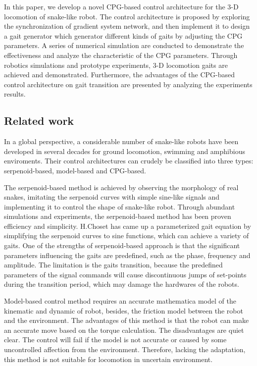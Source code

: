 \documentclass[letterpaper, 10 pt, conference]{ieeeconf}
\begin{document}
In this paper, we develop a novel CPG-based control architecture for the 3-D locomotion of snake-like robot. The control architecture is proposed by exploring the synchronization of gradient system network, and then implement it to design a gait generator which generator different kinds of gaits by adjusting the CPG parameters. A series of numerical simulation are conducted to demonstrate the effectiveness and analyze the characteristic of the CPG parameters. Through robotics simulations and prototype experiments, 3-D locomotion gaits are achieved and demonstrated. Furthermore, the advantages of the CPG-based control architecture on gait transition are presented by analyzing the experiments results.


\subsection{Related work}

In a global perspective, a considerable number of snake-like robots have been developed in several decades for ground locomotion\cite{ACMR3}, swimming\cite{ACMR5} and amphibious enviroments\cite{salamander_science}. Their control architectures can crudely be classified into three types: serpenoid-based, model-based and CPG-based\cite{SalamanderTransaction}.

The serpenoid-based method\cite{hirosebiologically} is achieved by observing the morphology of real snakes, imitating the serpenoid curves with simple sine-like signals and implementing it to control the shape of snake-like robot. Through abundant simulations and experiments, the serpenoid-based method has been proven efficiency and simplicity. H.Choset\cite{cmu_parameterized_gaits} has came up a parameterized gait equation by simplifying the serpenoid curves to sine functions, which can achieve a variety of gaits. One of the strengths of serpenoid-based approach is that the significant parameters influencing the gaits are predefined, such as the phase, frequency and amplitude. The limitation is the gaits transition, because the predefined parameters of the signal commands will cause discontinuous jumps of set-points during the transition period, which may damage the hardwares of the robots\cite{SalamanderTransaction}.

Model-based control method requires an accurate mathematica model of the kinematic\cite{kinematic_control} and dynamic\cite{dynamic_control} of robot, besides, the friction model\cite{shugen2001analysis} between the robot and the environment. The advantages of this method is that the robot can make an accurate move based on the torque calculation. The disadvantages are quiet clear. The control will fail if the model is not accurate or caused by some uncontrolled affection from the environment. Therefore, lacking the adaptation, this method is not suitable for locomotion in uncertain environment.
\end{document}
